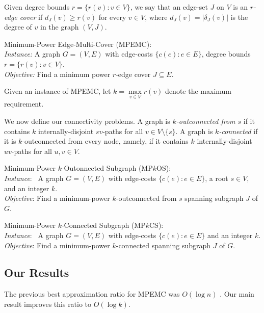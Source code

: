\documentclass{llncs}
\begin{document}
\begin{definition}
Given degree bounds $r=\{r(v):v \in V\}$, we say that an edge-set $J$
on $V$ is an {\em $r$-edge cover} if $d_J(v) \geq r(v)$ for every $v \in V$,
where $d_J(v)=|\delta_J(v)|$ is the degree of $v$ in the graph $(V,J)$.
\end{definition}


\noindent
{\sf Minimum-Power Edge-Multi-Cover} ({\sf MPEMC}): \\
{\em Instance:} 
A graph $G=(V,E)$ with edge-costs $\{c(e): e \in E\}$, 
degree bounds \hphantom{\em Instance: } 
$r=\{r(v):v \in V\}$. \\
{\em Objective:} 
Find a minimum power $r$-edge cover $J \subseteq E$.

\vspace{0.2cm}

Given an instance of {\sf MPEMC}, let $k=\max\limits_{v \in V} r(v)$ denote the maximum requirement.

We now define our connectivity problems. 
A  graph is {\em $k$-outconnected from $s$} if it contains $k$
internally-disjoint $sv$-paths for all $v \in V \setminus \{s\}$.
A graph is {\em $k$-connected} if it is $k$-outconnected from every node, 
namely, if it contains $k$ internally-disjoint $uv$-paths for all $u,v \in V$.

\vspace{0.2cm}

\noindent
{\sf Minimum-Power $k$-Outonnected Subgraph} ({\sf MP$k$OS}): \\
{\em Instance}: \ 
A graph $G=(V,E)$ with edge-costs $\{c(e): e \in E\}$, a root $s \in V$, and 
\hphantom{\em Instance: } an integer $k$. \\
{\em Objective}: 
Find a minimum-power $k$-outconnected from $s$ spanning subgraph $J$ 
\hphantom{\em Objective:} of $G$.

\vspace{0.2cm}

\noindent
{\sf Minimum-Power $k$-Connected Subgraph} ({\sf MP$k$CS}): \\
{\em Instance}: \ 
A graph $G=(V,E)$ with edge-costs $\{c(e): e \in E\}$ and an integer $k$. \\
{\em Objective}: 
Find a minimum-power $k$-connected spanning subgraph $J$ of $G$.


\subsection{Our Results}
The previous best approximation ratio for {\sf MPEMC} was $O(\log n)$ \cite{KMNT}. 
Our main result improves this ratio to $O(\log k)$.
\end{document}
